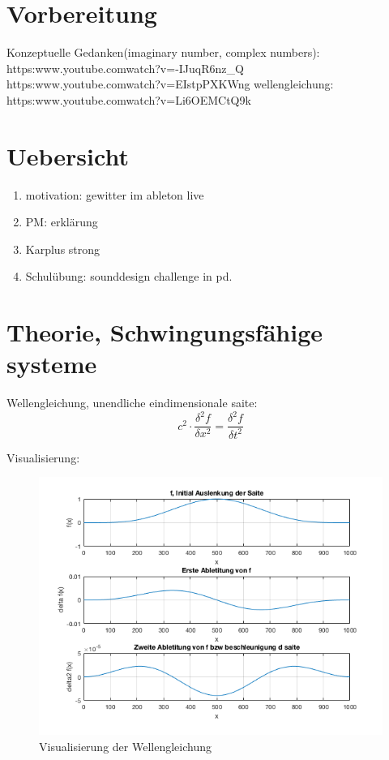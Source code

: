 \section{Vorbereitung}


Konzeptuelle Gedanken(imaginary number, complex numbers): \\
https:\/\/www.youtube.com\/watch?v=-IJuqR6nz\_Q \\
https:\/\/www.youtube.com\/watch?v=EIstpPXKWng
wellengleichung:\\
https:\/\/www.youtube.com\/watch?v=Li6OEMCtQ9k




\section{Uebersicht}


\begin{enumerate}
	\item motivation: gewitter im ableton live
	\item PM: erklärung
	\item Karplus strong 
	\item Schulübung: sounddesign challenge in pd.

\end{enumerate}

\section{Theorie, Schwingungsfähige systeme}


Wellengleichung, unendliche eindimensionale saite:
\begin{equation}
	c^2 \cdot \frac{\delta^2 f}{\delta x^2} = \frac{\delta ^2 f}{\delta t ^2}
\end{equation}

Visualisierung:

\begin{figure}[H]
  \begin{center}
    \includegraphics[width = 14cm]{img/wellengleichungVis.png}
    \caption{Visualisierung der Wellengleichung}
    \label{fig:wellengleichung}
  \end{center}
\end{figure}




